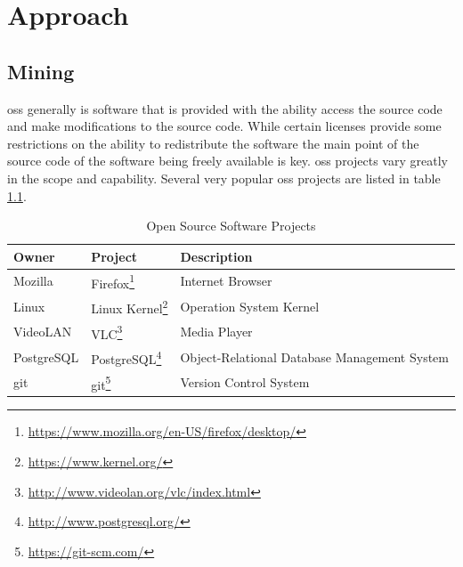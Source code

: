 \chapter{Approach}
\label{chap:approach}


\section{Mining}

\gls{oss} generally is software that is provided with the ability access the source code and make modifications to the source code. While certain licenses provide some restrictions on the ability to redistribute the software the main point of the source code of the software being freely available is key. \gls{oss} projects vary greatly in the scope and capability. Several very popular \gls{oss} projects are listed in table \ref{tab:oss_projects}.

\begin{table}
\begin{minipage}{\textwidth} 
\begin{center}
    \begin{tabular}{|l|l|l|}
        \hline
        Owner & Project & Description \\
        \hline
        Mozilla & Firefox\footnote{\url{https://www.mozilla.org/en-US/firefox/desktop/}} & Internet Browser \\
        Linux & Linux Kernel\footnote{\url{https://www.kernel.org/}} & Operation System Kernel \\
        VideoLAN & VLC\footnote{\url{http://www.videolan.org/vlc/index.html}} & Media Player \\
        PostgreSQL & PostgreSQL\footnote{\url{http://www.postgresql.org/}} & Object-Relational Database Management System \\
        git & git\footnote{\url{https://git-scm.com/}} & Version Control System \\
        \hline
    \end{tabular}
\end{center}
\caption{Open Source Software Projects}
\label{tab:oss_projects}
\end{minipage}
\end{table}

